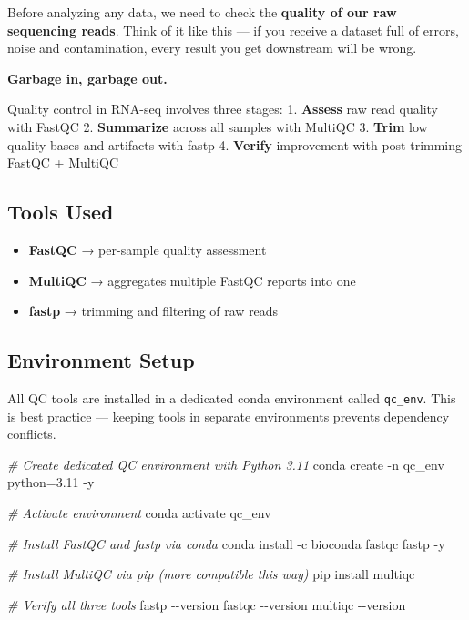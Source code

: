 \documentclass[
]{article}
\newenvironment{Shaded}{\begin{snugshade}}{\end{snugshade}}
\newcommand{\AttributeTok}[1]{\textcolor[rgb]{0.13,0.29,0.53}{#1}}
\newcommand{\CommentTok}[1]{\textcolor[rgb]{0.56,0.35,0.01}{\textit{#1}}}
\newcommand{\ExtensionTok}[1]{#1}
\newcommand{\NormalTok}[1]{#1}
\providecommand{\tightlist}{%
  \setlength{\itemsep}{0pt}\setlength{\parskip}{0pt}}
\begin{document}
Before analyzing any data, we need to check the \textbf{quality of our
raw sequencing reads}. Think of it like this --- if you receive a
dataset full of errors, noise and contamination, every result you get
downstream will be wrong.

\textbf{Garbage in, garbage out.}

Quality control in RNA-seq involves three stages: 1. \textbf{Assess} raw
read quality with FastQC 2. \textbf{Summarize} across all samples with
MultiQC 3. \textbf{Trim} low quality bases and artifacts with fastp 4.
\textbf{Verify} improvement with post-trimming FastQC + MultiQC

\subsection{Tools Used}\label{tools-used}

\begin{itemize}
\tightlist
\item
  \textbf{FastQC} → per-sample quality assessment
\item
  \textbf{MultiQC} → aggregates multiple FastQC reports into one
\item
  \textbf{fastp} → trimming and filtering of raw reads
\end{itemize}

\subsection{Environment Setup}\label{environment-setup}

All QC tools are installed in a dedicated conda environment called
\texttt{qc\_env}. This is best practice --- keeping tools in separate
environments prevents dependency conflicts.

\begin{Shaded}
\begin{Highlighting}[]
\CommentTok{\# Create dedicated QC environment with Python 3.11}
\ExtensionTok{conda}\NormalTok{ create }\AttributeTok{{-}n}\NormalTok{ qc\_env python=3.11 }\AttributeTok{{-}y}

\CommentTok{\# Activate environment}
\ExtensionTok{conda}\NormalTok{ activate qc\_env}

\CommentTok{\# Install FastQC and fastp via conda}
\ExtensionTok{conda}\NormalTok{ install }\AttributeTok{{-}c}\NormalTok{ bioconda fastqc fastp }\AttributeTok{{-}y}

\CommentTok{\# Install MultiQC via pip (more compatible this way)}
\ExtensionTok{pip}\NormalTok{ install multiqc}

\CommentTok{\# Verify all three tools}
\ExtensionTok{fastp} \AttributeTok{{-}{-}version}
\ExtensionTok{fastqc} \AttributeTok{{-}{-}version}
\ExtensionTok{multiqc} \AttributeTok{{-}{-}version}
\end{Highlighting}
\end{Shaded}
\end{document}
